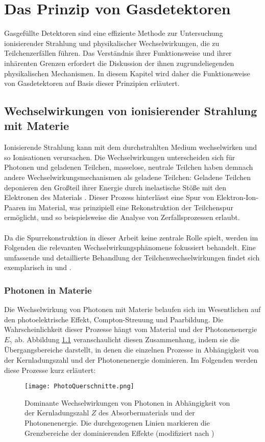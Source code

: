 \chapter{Das Prinzip von Gasdetektoren}

\noindent Gasgefüllte Detektoren sind eine effiziente Methode zur Untersuchung ionisierender Strahlung und physikalischer Wechselwirkungen, die zu Teilchenzerfällen führen. Das Verständnis ihrer Funktionsweise und ihrer inhärenten Grenzen erfordert die Diskussion der ihnen zugrundeliegenden physikalischen Mechanismen. In diesem Kapitel wird daher die Funktionsweise von Gasdetektoren auf Basis dieser Prinzipien erläutert.

	\section{Wechselwirkungen von ionisierender Strahlung mit Materie}
	Ionisierende Strahlung kann mit dem durchstrahlten Medium wechselwirken und so Ionisationen verursachen. Die Wechselwirkungen unterscheiden sich für Photonen und geladenen Teilchen, masselose, neutrale Teilchen haben demnach andere Wechselwirkungsmechanismen als geladene Teilchen: Geladene Teilchen deponieren den Großteil ihrer Energie durch inelastische Stöße mit den Elektronen des Materials \cite{Leo}. Dieser Prozess hinterlässt eine Spur von Elektron-Ion-Paaren im Material, was prinzipiell eine Rekonstruktion der Teilchenspur ermöglicht, und so beispielsweise die Analyse von Zerfallsprozessen erlaubt.\\
	\\
	Da die Spurrekonstruktion in dieser Arbeit keine zentrale Rolle spielt, werden im Folgenden die relevanten Wechselwirkungsphänomene fokussiert behandelt. Eine umfassende und detaillierte Behandlung der Teilchenwechselwirkungen findet sich exemplarisch in \cite{Leo} und \cite{Sauli_Multiwire}.

	\subsection{Photonen in Materie} \label{chap:Photonen}
	Die Wechselwirkung von Photonen mit Materie belaufen sich im Wesentlichen auf den photoelektrische Effekt, Compton-Streuung und Paarbildung. Die Wahrscheinlichkeit dieser Prozesse hängt vom Material und der Photonenenergie $E_{\gamma}$ ab. Abbildung \ref{fig:WirkungsquerschnittePhotonen} veranschaulicht diesen Zusammenhang, indem sie die Übergangsbereiche darstellt, in denen die einzelnen Prozesse in Abhängigkeit von der Kernladungszahl und der Photonenenergie dominieren. Im Folgenden werden diese Prozesse kurz erläutert:
	\begin{figure}[h]
		\centering
		\texttt{[image: PhotoQuerschnitte.png]}
		\caption{Dominante Wechselwirkungen von Photonen in Abhängigkeit von der Kernladungszahl $Z$ des Absorbermaterials und der Photonenenergie. Die durchgezogenen Linien markieren die Grenzbereiche der dominierenden Effekte (modifiziert nach \cite{DemtroderKerne})}
		\label{fig:WirkungsquerschnittePhotonen}
	\end{figure}
	
